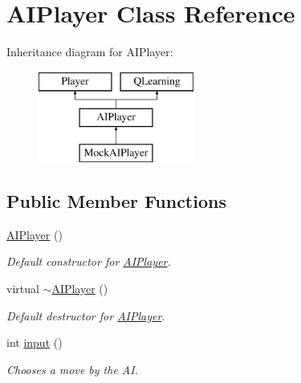 \hypertarget{classAIPlayer}{}\section{A\+I\+Player Class Reference}
\label{classAIPlayer}
Inheritance diagram for A\+I\+Player\+:\begin{figure}[H]
\begin{center}
\leavevmode
\includegraphics[height=3.000000cm]{classAIPlayer}
\end{center}
\end{figure}
\subsection*{Public Member Functions}
\begin{DoxyCompactItemize}
\item 
\mbox{\label{classAIPlayer_ae791562645a443fead734b4bdcb1509e}} 
\mbox{\hyperlink{classAIPlayer_ae791562645a443fead734b4bdcb1509e}{A\+I\+Player}} ()
\begin{DoxyCompactList}\small\item\em Default constructor for \mbox{\hyperlink{classAIPlayer}{A\+I\+Player}}. \end{DoxyCompactList}\item 
\mbox{\label{classAIPlayer_a2d879575d692d246da3890b6234104b8}} 
virtual \mbox{\hyperlink{classAIPlayer_a2d879575d692d246da3890b6234104b8}{$\sim$\+A\+I\+Player}} ()
\begin{DoxyCompactList}\small\item\em Default destructor for \mbox{\hyperlink{classAIPlayer}{A\+I\+Player}}. \end{DoxyCompactList}\item 
int \mbox{\hyperlink{classAIPlayer_a4a431bc5cf71781bdd311b08c47d27dc}{input}} ()
\begin{DoxyCompactList}\small\item\em Chooses a move by the AI. \end{DoxyCompactList}\end{DoxyCompactItemize}
